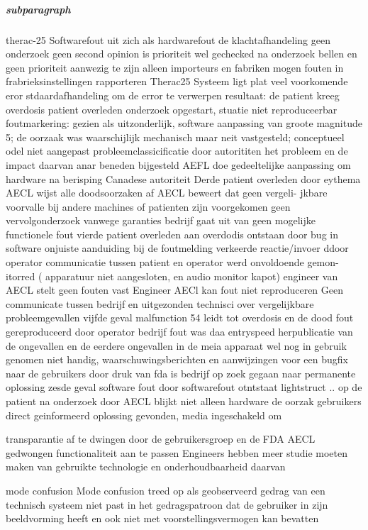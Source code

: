 \subparagraph{subparagraph}
therac-25 
Softwarefout uit zich als hardwarefout de klachtafhandeling geen onderzoek geen second opinion is prioriteit wel 
gechecked na onderzoek bellen en geen prioriteit aanwezig te zijn alleen importeurs en fabriken mogen fouten 
in frabrieksinstellingen rapporteren 
Therac25 Systeem ligt plat veel voorkomende eror stdaardafhandeling om de error te verwerpen resultaat: 
de patient kreeg overdosis patient overleden onderzoek opgestart, stuatie niet reproduceerbar foutmarkering: 
gezien als uitzonderlijk, software aanpassing van groote magnitude 5; de oorzaak was waarschijlijk mechanisch 
maar neit vastgesteld; conceptueel odel niet aangepast probleemclassicificatie door autorititen het probleem 
en de impact daarvan anar beneden bijgesteld AEFL doe gedeeltelijke aanpassing om hardware na berisping 
Canadese autoriteit 
Derde patient overleden door eythema AECL wijst alle doodsoorzaken af AECL beweert dat geen vergeli- 
jkbare voorvalle bij andere machines of patienten zijn voorgekomen geen vervolgonderzoek vanwege garanties 
bedrijf gaat uit van geen mogelijke functionele fout 
vierde patient overleden aan overdodis ontstaan door bug in software onjuiste aanduiding bij de foutmelding 
verkeerde reactie/invoer ddoor operator communicatie tussen patient en operator werd onvoldoende gemon- 
itorred ( apparatuur niet aangesloten, en audio monitor kapot) engineer van AECL stelt geen fouten vast 
Engineer AECl kan fout niet reproduceren Geen communicate tussen bedrijf en uitgezonden technisci over 
vergelijkbare probleemgevallen 
vijfde geval malfunction 54 leidt tot overdosis en de dood fout gereproduceerd door operator bedrijf fout 
was daa entryspeed herpublicatie van de ongevallen en de eerdere ongevallen in de meia apparaat wel nog in 
gebruik genomen niet handig, waarschuwingsberichten en aanwijzingen voor een bugfix naar de gebruikers door 
druk van fda is bedrijf op zoek gegaan naar permanente oplossing 
zesde geval software fout door softwarefout otntstaat lightstruct .. op de patient na onderzoek door AECL 
blijkt niet alleen hardware de oorzak gebruikers direct geinformeerd oplossing gevonden, media ingeschakeld om 

transparantie af te dwingen door de gebruikersgroep en de FDA AECL gedwongen functionaliteit aan te passen 
Engineers hebben meer studie moeten maken van gebruikte technologie en onderhoudbaarheid daarvan 


mode confusion 
Mode confusion treed op als geobserveerd gedrag van een technisch systeem niet past in het gedragspatroon 
dat de gebruiker in zijn beeldvorming heeft en ook niet met voorstellingsvermogen kan bevatten 

